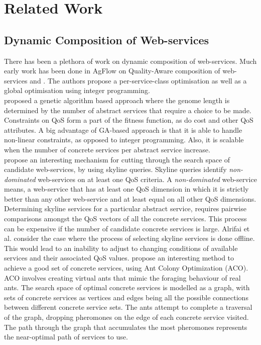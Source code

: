 \documentclass[10pt,journal,compsoc]{IEEEtran}
\begin{document}
\section{Related Work}
    
\subsection{Dynamic Composition of Web-services} \label{dynamic_wsc}
There has been a plethora of work on dynamic composition of web-services. Much early work has been done in AgFlow \cite{Zeng2001AgFlow} on Quality-Aware composition of web-services \cite{Benatallah2002Declarative} and \cite{Zeng2003Quality}. The authors propose a per-service-class optimisation as well as a global optimisation using integer programming.\\
\cite{Canfora2005approach} proposed a genetic algorithm based approach where the genome length is determined by the number of abstract services that require a choice to be made. Constraints on QoS form a part of the fitness function, as do cost and other QoS attributes. A big advantage of GA-based approach is that it is able to handle non-linear constraints, as opposed to integer programming. Also, it is scalable when the number of concrete services per abstract service increase.\\
\cite{Alrifai2010Selecting} propose an interesting mechanism for cutting through the search space of candidate web-services, by using skyline queries. Skyline queries identify \textit{non-dominated} web-services on at least one QoS criteria. A \textit{non-dominated} web-service means, a web-service that has at least one QoS dimension in which it is strictly better than any other web-service and at least equal on all other QoS dimensions. Determining skyline services for a particular abstract service, requires pairwise comparisons amongst the QoS vectors of all the concrete services. This process can be expensive if the number of candidate concrete services is large. Alrifai et al. consider the case where the process of selecting skyline services is done offline. This would lead to an inability to adjust to changing conditions of available services and their associated QoS values. 	
\cite{Zhang2010QoS-Based} propose an interesting method to achieve a good set of concrete services, using Ant Colony Optimization (ACO). ACO involves creating virtual ants that mimic the foraging behaviour of real ants. The search space of optimal concrete services is modelled as a graph, with sets of concrete services as vertices and edges being all the possible connections between different concrete service sets. The ants attempt to complete a traversal of the graph, dropping pheromones on the edge of each concrete service visited. The path through the graph that accumulates the most pheromones represents the near-optimal path of services to use.
\end{document}
